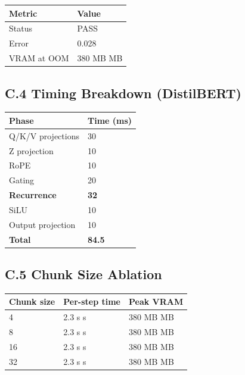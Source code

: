 \begin{table}[H]
\centering
\small
\begin{tabular}{ll}
\toprule
\textbf{Metric} & \textbf{Value} \\
\midrule
Status & PASS \\
Error & 0.028 \\
VRAM at OOM & 380 MB MB \\
\bottomrule
\end{tabular}
\end{table}

\subsection{C.4 Timing Breakdown (DistilBERT)}

\begin{table}[H]
\centering
\small
\begin{tabular}{ll}
\toprule
\textbf{Phase} & \textbf{Time (ms)} \\
\midrule
Q/K/V projections & 30 \\
Z projection & 10 \\
RoPE & 10 \\
Gating & 20 \\
\textbf{Recurrence} & \textbf{32} \\
SiLU & 10 \\
Output projection & 10 \\
\textbf{Total} & \textbf{84.5} \\
\bottomrule
\end{tabular}
\end{table}

\subsection{C.5 Chunk Size Ablation}

\begin{table}[H]
\centering
\small
\begin{tabular}{lll}
\toprule
\textbf{Chunk size} & \textbf{Per-step time} & \textbf{Peak VRAM} \\
\midrule
4 & 2.3 s s & 380 MB MB \\
8 & 2.3 s s & 380 MB MB \\
16 & 2.3 s s & 380 MB MB \\
32 & 2.3 s s & 380 MB MB \\
\bottomrule
\end{tabular}
\end{table}

